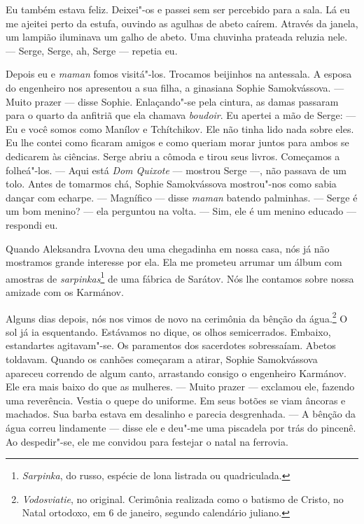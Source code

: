 Eu também estava feliz. Deixei"-os e passei sem ser percebido para a
sala. Lá eu me ajeitei perto da estufa, ouvindo as agulhas de abeto
caírem. Através da janela, um lampião iluminava um galho de abeto. Uma
chuvinha prateada reluzia nele. --- Serge, Serge, ah, Serge --- repetia
eu.

Depois eu e \emph{maman} fomos visitá"-los. Trocamos beijinhos na
antessala. A esposa do engenheiro nos apresentou a sua filha, a
ginasiana Sophie Samokvássova. --- Muito prazer --- disse Sophie.
Enlaçando"-se pela cintura, as damas passaram para o quarto da anfitriã
que ela chamava \emph{boudoir}. Eu apertei a mão de Serge: --- Eu e você
somos como Manílov e Tchítchikov. Ele não tinha lido nada sobre eles. Eu
lhe contei como ficaram amigos e como queriam morar juntos para ambos se
dedicarem às ciências. Serge abriu a cômoda e tirou seus livros.
Começamos a folheá"-los. --- Aqui está \emph{Dom Quixote} --- mostrou
Serge ---, não passava de um tolo. Antes de tomarmos chá, Sophie
Samokvássova mostrou"-nos como sabia dançar com echarpe. --- Magnífico
--- disse \emph{maman} batendo palminhas. --- Serge é um bom menino? ---
ela perguntou na volta. --- Sim, ele é um menino educado --- respondi
eu.

Quando Aleksandra Lvovna deu uma chegadinha em nossa casa, nós já não
mostramos grande interesse por ela. Ela me prometeu arrumar um álbum com
amostras de \emph{sarpinkas}\footnote{\emph{Sarpinka}, do russo, espécie
  de lona listrada ou quadriculada.} de uma fábrica de Sarátov. Nós lhe
contamos sobre nossa amizade com os Karmánov.

Alguns dias depois, nós nos vimos de novo na cerimônia da bênção da
água.\footnote{\emph{Vodosviatie}, no original. Cerimônia realizada como
  o batismo de Cristo, no Natal ortodoxo, em 6 de janeiro, segundo
  calendário juliano.} O sol já ia esquentando. Estávamos no dique, os
olhos semicerrados. Embaixo, estandartes agitavam"-se. Os paramentos dos
sacerdotes sobressaíam. Abetos toldavam. Quando os canhões começaram a
atirar, Sophie Samokvássova apareceu correndo de algum canto, arrastando
consigo o engenheiro Karmánov. Ele era mais baixo do que as mulheres.
--- Muito prazer --- exclamou ele, fazendo uma reverência. Vestia o
quepe do uniforme. Em seus botões se viam âncoras e machados. Sua barba
estava em desalinho e parecia desgrenhada. --- A bênção da água correu
lindamente --- disse ele e deu"-me uma piscadela por trás do pincenê. Ao
despedir"-se, ele me convidou para festejar o natal na ferrovia.

